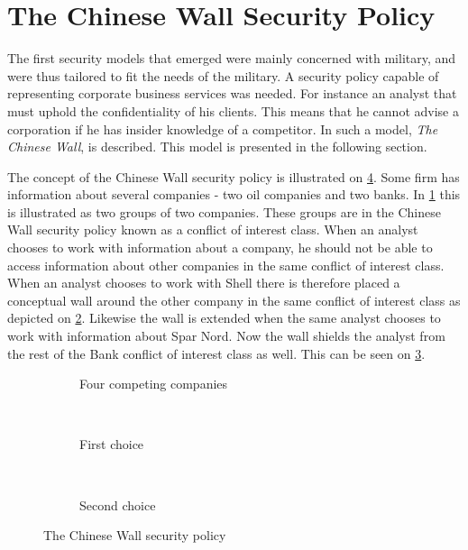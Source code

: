 \section{The Chinese Wall Security Policy}
The first security models that emerged were mainly concerned with military, and were thus tailored to fit the needs of the military.
A security policy capable of representing corporate business services was needed.
For instance an analyst that must uphold the confidentiality of his clients.
This means that he cannot advise a corporation if he has insider knowledge of a competitor.
In \citet{brewer1989chinese} such a model, \emph{The Chinese Wall}, is described.
This model is presented in the following section.

The concept of the Chinese Wall security policy is illustrated on \cref{chinese:illu}.
Some firm has information about several companies - two oil companies and two banks.
In \cref{chinese:situation} this is illustrated as two groups of two companies.
These groups are in the Chinese Wall security policy known as a conflict of interest class.
When an analyst chooses to work with information about a company, he should not be able to access information about other companies in the same conflict of interest class.
When an analyst chooses to work with Shell there is therefore placed a conceptual wall around the other company in the same conflict of interest class as depicted on \cref{chinese:choice1}.
Likewise the wall is extended when the same analyst chooses to work with information about Spar Nord.
Now the wall shields the analyst from the rest of the Bank conflict of interest class as well.
This can be seen on \cref{chinese:choice2}.

\begin{figure}[H]
\centering
    \begin{subfigure}[t]{0.3\textwidth}
        \resizebox{\linewidth}{!}{}
        \caption{Four competing companies}
        \label{chinese:situation}
    \end{subfigure}
    ~
    \begin{subfigure}[t]{0.3\textwidth}
        \resizebox{\linewidth}{!}{}
        \caption{First choice}
        \label{chinese:choice1}
    \end{subfigure}
    ~
    \begin{subfigure}[t]{0.3\textwidth}
        \resizebox{\linewidth}{!}{}
        \caption{Second choice}
        \label{chinese:choice2}
    \end{subfigure}
    \caption{The Chinese Wall security policy}\label{chinese:illu}
\end{figure}


